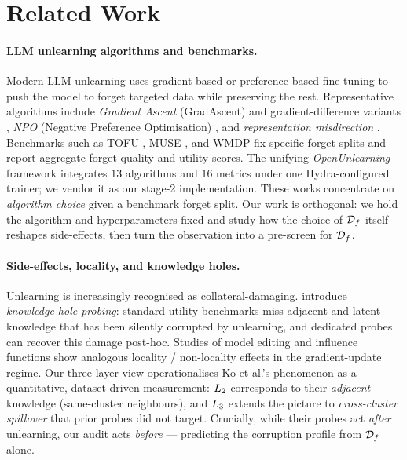 \section{Related Work}
\label{sec:related}

\paragraph{LLM unlearning algorithms and benchmarks.}
Modern LLM unlearning uses gradient-based or preference-based fine-tuning to push the model to forget targeted data while preserving the rest. Representative algorithms include \emph{Gradient Ascent} (GradAscent) and gradient-difference variants \citep{jang2023knowledge}, \emph{NPO} (Negative Preference Optimisation) \citep{zhang2024negative}, and \emph{representation misdirection} \citep{li2024wmdp}. Benchmarks such as TOFU \citep{maini2024tofu}, MUSE \citep{shi2024muse}, and WMDP \citep{li2024wmdp} fix specific forget splits and report aggregate forget-quality and utility scores. The unifying \emph{OpenUnlearning} framework \citep{dorna2025openunlearning} integrates $13$ algorithms and $16$ metrics under one Hydra-configured trainer; we vendor it as our stage-2 implementation. These works concentrate on \emph{algorithm choice} given a benchmark forget split. Our work is orthogonal: we hold the algorithm and hyperparameters fixed and study how the choice of $\mathcal{D}_f$ itself reshapes side-effects, then turn the observation into a pre-screen for $\mathcal{D}_f$.

\paragraph{Side-effects, locality, and knowledge holes.}
Unlearning is increasingly recognised as collateral-damaging. \citet{ko2025probing} introduce \emph{knowledge-hole probing}: standard utility benchmarks miss adjacent and latent knowledge that has been silently corrupted by unlearning, and dedicated probes can recover this damage post-hoc. Studies of model editing \citep{meng2022locating, mitchell2022memory} and influence functions \citep{koh2017understanding, grosse2023studying} show analogous locality / non-locality effects in the gradient-update regime. Our three-layer view operationalises Ko et al.'s phenomenon as a quantitative, dataset-driven measurement: $L_2$ corresponds to their \emph{adjacent} knowledge (same-cluster neighbours), and $L_3$ extends the picture to \emph{cross-cluster spillover} that prior probes did not target. Crucially, while their probes act \emph{after} unlearning, our audit acts \emph{before} --- predicting the corruption profile from $\mathcal{D}_f$ alone.

